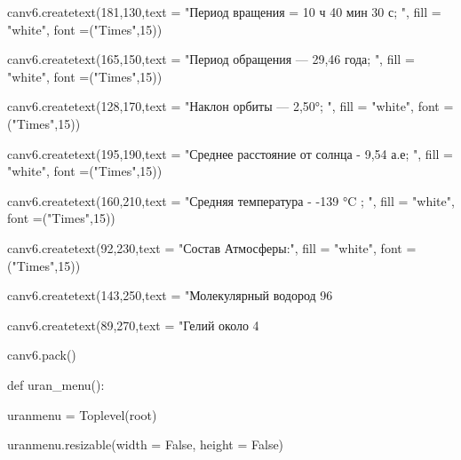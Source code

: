 \documentclass[14pt, oneside]{SavkinSeliverstov}
\begin{document}
	canv\underline{\hspace{0.2cm}}6.create\underline{\hspace{0.2cm}}text(181,130,text = "Период вращения = 10 ч 40 мин 30 с; ", fill = "white", font =("Times",15))
	
	canv\underline{\hspace{0.2cm}}6.create\underline{\hspace{0.2cm}}text(165,150,text = "Период обращения — 29,46 года; ", fill = "white", font =("Times",15))
	
	canv\underline{\hspace{0.2cm}}6.create\underline{\hspace{0.2cm}}text(128,170,text = "Наклон орбиты — 2,50°; ", fill = "white", font =("Times",15))

	canv\underline{\hspace{0.2cm}}6.create\underline{\hspace{0.2cm}}text(195,190,text = "Среднее расстояние от солнца - 9,54 а.е; ", fill = "white", font =("Times",15))
	
	canv\underline{\hspace{0.2cm}}6.create\underline{\hspace{0.2cm}}text(160,210,text = "Средняя температура - -139  °C ; ", fill = "white", font =("Times",15))

	canv\underline{\hspace{0.2cm}}6.create\underline{\hspace{0.2cm}}text(92,230,text = "Состав Атмосферы:", fill = "white", font =("Times",15))
	
	canv\underline{\hspace{0.2cm}}6.create\underline{\hspace{0.2cm}}text(143,250,text = "Молекулярный водород 96%
	
	canv\underline{\hspace{0.2cm}}6.create\underline{\hspace{0.2cm}}text(89,270,text = "Гелий около 4%
	
	canv\underline{\hspace{0.2cm}}6.pack()

def uran_menu():

	uran\underline{\hspace{0.2cm}}menu = Toplevel(root)
	
	uran\underline{\hspace{0.2cm}}menu.resizable(width = False, height = False)
\end{document}
